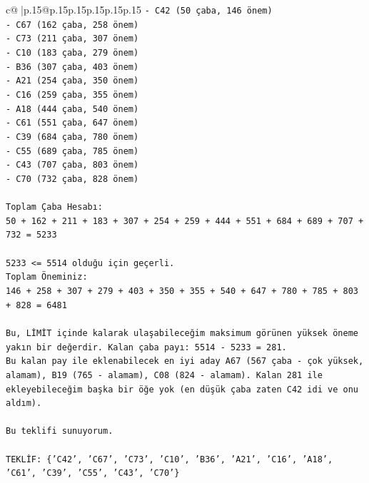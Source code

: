\documentclass{article}
\begin{document}
{\begin{supertabular}{c@{$\;$}|p{.15\linewidth}@{}p{.15\linewidth}p{.15\linewidth}p{.15\linewidth}p{.15\linewidth}p{.15\linewidth}}
{{{\texttt{{-} C42 (50 çaba, 146 önem)} \\
\texttt{{-} C67 (162 çaba, 258 önem)} \\
\texttt{{-} C73 (211 çaba, 307 önem)} \\
\texttt{{-} C10 (183 çaba, 279 önem)} \\
\texttt{{-} B36 (307 çaba, 403 önem)} \\
\texttt{{-} A21 (254 çaba, 350 önem)} \\
\texttt{{-} C16 (259 çaba, 355 önem)} \\
\texttt{{-} A18 (444 çaba, 540 önem)} \\
\texttt{{-} C61 (551 çaba, 647 önem)} \\
\texttt{{-} C39 (684 çaba, 780 önem)} \\
\texttt{{-} C55 (689 çaba, 785 önem)} \\
\texttt{{-} C43 (707 çaba, 803 önem)} \\
\texttt{{-} C70 (732 çaba, 828 önem)} \\
\\ 
\texttt{Toplam Çaba Hesabı:} \\
\texttt{50 + 162 + 211 + 183 + 307 + 254 + 259 + 444 + 551 + 684 + 689 + 707 + 732 = 5233} \\
\\ 
\texttt{5233 <= 5514 olduğu için geçerli.} \\
\texttt{Toplam Öneminiz:} \\
\texttt{146 + 258 + 307 + 279 + 403 + 350 + 355 + 540 + 647 + 780 + 785 + 803 + 828 = 6481} \\
\\ 
\texttt{Bu, LİMİT içinde kalarak ulaşabileceğim maksimum görünen yüksek öneme yakın bir değerdir. Kalan çaba payı: 5514 {-} 5233 = 281.} \\
\texttt{Bu kalan pay ile eklenabilecek en iyi aday A67 (567 çaba {-} çok yüksek, alamam), B19 (765 {-} alamam), C08 (824 {-} alamam). Kalan 281 ile ekleyebileceğim başka bir öğe yok (en düşük çaba zaten C42 idi ve onu aldım).} \\
\\ 
\texttt{Bu teklifi sunuyorum.} \\
\\ 
\texttt{TEKLİF: \{'C42', 'C67', 'C73', 'C10', 'B36', 'A21', 'C16', 'A18', 'C61', 'C39', 'C55', 'C43', 'C70'\}} \\
            }
        }
    }
     \\ \\


\end{supertabular}}
\end{document}
